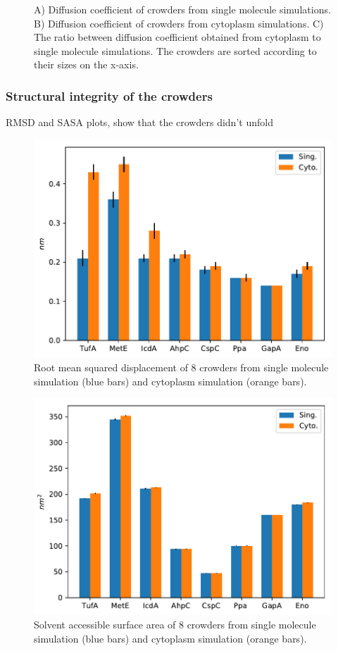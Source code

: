 \documentclass[journal=jacsat,manuscript=article]{achemso}
\begin{document}
\begin{figure}
\caption{A) Diffusion coefficient of crowders from single molecule simulations.  B) Diffusion coefficient of crowders from cytoplasm simulations. C) The ratio between diffusion coefficient obtained from cytoplasm to single molecule simulations. The crowders are sorted according to their sizes on the x-axis.}
\end{figure}

\subsubsection{Structural integrity of the crowders}
RMSD and SASA plots, show that the crowders didn't unfold


\begin{figure}
\includegraphics[scale=0.6]{rmsd.pdf}
\caption{Root mean squared displacement of 8 crowders from single molecule simulation (blue bars) and cytoplasm simulation (orange bars).}
\end{figure}

\begin{figure}
\includegraphics[scale=0.6]{sasa.pdf}
\caption{Solvent accessible surface area of 8 crowders from single molecule simulation (blue bars) and cytoplasm simulation (orange bars).}

\end{figure}
\end{document}
